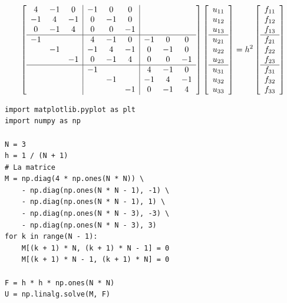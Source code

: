 \documentclass{beamer}
\begin{document}
 \begin{frame}  
 \[
\left[\begin{array}{ccc|ccc|ccc}
4&-1&0&-1&0&0\\
-1&4&-1&0&-1&0\\
0&-1&4&0&0&-1\\  \hline
-1&&&4&-1&0&-1&0&0\\
&-1&&-1&4&-1&0&-1&0\\
&&-1&0&-1&4&0&0&-1\\  \hline
&&&-1&&&4&-1&0\\
&&&&-1&&-1&4&-1\\
&&&&&-1&0&-1&4
\end{array}\right]
\left[\begin{array}{c}
u_{11}\\u_{12}\\ u_{13} \\  \hline
u_{21}\\u_{22}\\ u_{23} \\  \hline
u_{31}\\u_{32}\\ u_{33}
\end{array}\right] =h^2\left[\begin{array}{c}
f_{11}\\f_{12}\\ f_{13} \\ \hline
 f_{21}\\f_{22}\\ f_{23} \\  \hline
 f_{31}\\f_{32}\\ f_{33}
\end{array}\right]
\] 
 
\end{frame}



\begin{frame}[fragile] 
\begin{lstlisting}
import matplotlib.pyplot as plt
import numpy as np

N = 3
h = 1 / (N + 1)
# La matrice
M = np.diag(4 * np.ones(N * N)) \
    - np.diag(np.ones(N * N - 1), -1) \
    - np.diag(np.ones(N * N - 1), 1) \
    - np.diag(np.ones(N * N - 3), -3) \
    - np.diag(np.ones(N * N - 3), 3)
for k in range(N - 1):
    M[(k + 1) * N, (k + 1) * N - 1] = 0
    M[(k + 1) * N - 1, (k + 1) * N] = 0

F = h * h * np.ones(N * N)
U = np.linalg.solve(M, F)
\end{lstlisting}
 

 \end{frame}
\end{document}
